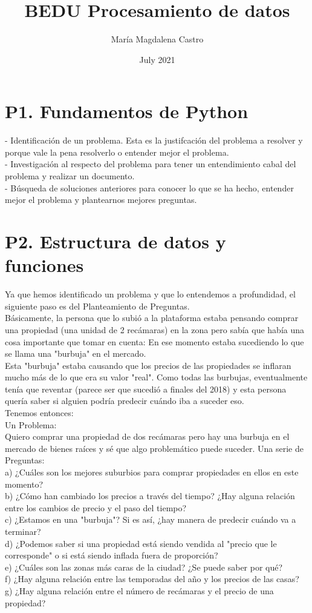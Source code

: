 \documentclass{article}
\title{BEDU Procesamiento de datos}
\author{María  Magdalena Castro}
\date{July 2021}
\begin{document}
\maketitle
\section{P1. Fundamentos de Python}
- Identificación de un problema. Esta es la justifcación del problema a resolver y porque vale la pena resolverlo o entender mejor el problema.\\
- Investigación al respecto del problema para tener un entendimiento cabal del problema y realizar un documento. \\
- Búsqueda de soluciones anteriores para conocer lo que se ha hecho, entender mejor el problema y plantearnos mejores preguntas. 
\section{P2. Estructura de datos y funciones}
Ya que hemos identificado un problema y que lo entendemos a profundidad, el siguiente paso es del Planteamiento de Preguntas.\\
Básicamente, la persona que lo subió a la plataforma estaba pensando comprar una propiedad (una unidad de 2 recámaras) en la zona pero sabía que había una cosa importante que tomar en cuenta: En ese momento estaba sucediendo lo que se llama una "burbuja" en el mercado.\\
Esta "burbuja" estaba causando que los precios de las propiedades se inflaran mucho más de lo que era su valor "real". Como todas las burbujas, eventualmente tenía que reventar (parece ser que sucedió a finales del 2018) y esta persona quería saber si alguien podría predecir cuándo iba a suceder eso.\\
Tenemos entonces:\\
Un Problema:\\
Quiero comprar una propiedad de dos recámaras pero hay una burbuja en el mercado de bienes raíces y sé que algo problemático puede suceder.
Una serie de Preguntas:\\
a) ¿Cuáles son los mejores suburbios para comprar propiedades en ellos en este momento?\\
b) ¿Cómo han cambiado los precios a través del tiempo? ¿Hay alguna relación entre los cambios de precio y el paso del tiempo?\\
c) ¿Estamos en una "burbuja"? Si es así, ¿hay manera de predecir cuándo va a terminar?\\
d) ¿Podemos saber si una propiedad está siendo vendida al "precio que le corresponde" o si está siendo inflada fuera de proporción?\\
e) ¿Cuáles son las zonas más caras de la ciudad? ¿Se puede saber por qué?\\
f) ¿Hay alguna relación entre las temporadas del año y los precios de las casas?\\
g) ¿Hay alguna relación entre el número de recámaras y el precio de una propiedad?
\end{document}

